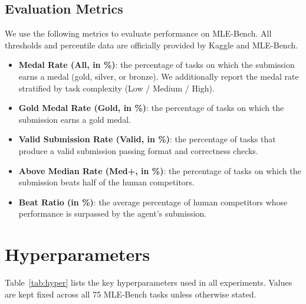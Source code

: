 \subsection{Evaluation Metrics}
\label{appen:eval}
We use the following metrics to evaluate performance on MLE-Bench. All thresholds and percentile data are officially provided by Kaggle and MLE-Bench.

\begin{itemize}[leftmargin=*]
    \item \textbf{Medal Rate (All, in \%)}: the percentage of tasks on which the submission earns a medal (gold, silver, or bronze). We additionally report the medal rate stratified by task complexity (Low / Medium / High).
    \item \textbf{Gold Medal Rate (Gold, in \%)}: the percentage of tasks on which the submission earns a gold medal.
    \item \textbf{Valid Submission Rate (Valid, in \%)}: the percentage of tasks that produce a valid submission passing format and correctness checks.
    \item \textbf{Above Median Rate (Med+, in \%)}: the percentage of tasks on which the submission beats half of the human competitors.
    \item \textbf{Beat Ratio (in \%)}: the average percentage of human competitors whose performance is surpassed by the agent's submission.
\end{itemize}


\section{Hyperparameters}
\label{appen:hyper}

Table~\ref{tab:hyper} lists the key hyperparameters used in all \sname experiments. Values are kept fixed across all 75 MLE-Bench tasks unless otherwise stated.

